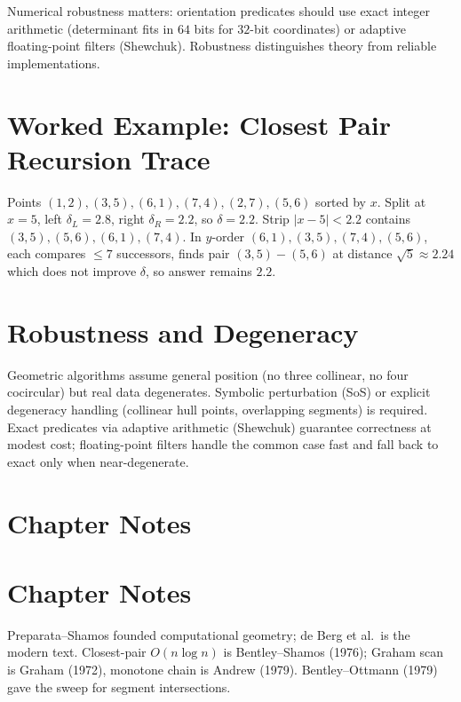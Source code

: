 Numerical robustness matters: orientation predicates should use exact integer arithmetic (determinant fits in $64$ bits for $32$-bit coordinates) or adaptive floating-point filters (Shewchuk). Robustness distinguishes theory from reliable implementations.


\section{Worked Example: Closest Pair Recursion Trace}
\label{sec:cp-trace}

Points $(1,2),(3,5),(6,1),(7,4),(2,7),(5,6)$ sorted by $x$. Split at $x=5$, left $\delta_L=2.8$, right $\delta_R=2.2$, so $\delta=2.2$. Strip $|x-5|<2.2$ contains $(3,5),(5,6),(6,1),(7,4)$. In $y$-order $(6,1),(3,5),(7,4),(5,6)$, each compares $\le7$ successors, finds pair $(3,5)-(5,6)$ at distance $\sqrt5\approx2.24$ which does not improve $\delta$, so answer remains $2.2$.

\section{Robustness and Degeneracy}
\label{sec:robust}

Geometric algorithms assume general position (no three collinear, no four cocircular) but real data degenerates. Symbolic perturbation (SoS) or explicit degeneracy handling (collinear hull points, overlapping segments) is required. Exact predicates via adaptive arithmetic (Shewchuk) guarantee correctness at modest cost; floating-point filters handle the common case fast and fall back to exact only when near-degenerate.

\section{Chapter Notes}
\section{Chapter Notes}
Preparata--Shamos founded computational geometry; de Berg et al.\ is the modern text. Closest-pair $O(n\log n)$ is Bentley--Shamos (1976); Graham scan is Graham (1972), monotone chain is Andrew (1979). Bentley--Ottmann (1979) gave the sweep for segment intersections.

